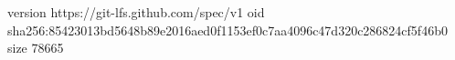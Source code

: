 version https://git-lfs.github.com/spec/v1
oid sha256:85423013bd5648b89e2016aed0f1153ef0c7aa4096c47d320c286824cf5f46b0
size 78665
